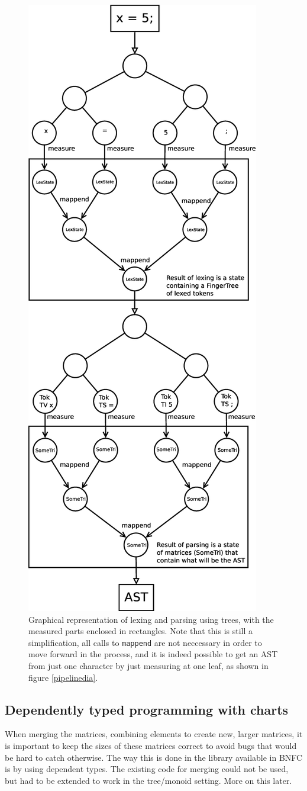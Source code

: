 \documentclass[a4paper,12pt,twosided]{report}
\begin{document}
\begin{figure}[H]
\centering
\includegraphics[width=.5\textwidth]{tree.eps}
\caption{\label{treemeasure}Graphical representation of lexing and parsing using
trees, with the measured parts enclosed in rectangles. Note that this is still a
simplification, all calls to \texttt{mappend} are not neccessary in order to
move forward in the process, and it is indeed possible to get an AST from just
one character by just measuring at one leaf, as shown in figure
\ref{pipelinedia}.}
\end{figure}

\subsection{Dependently typed programming with charts}
When merging the matrices, combining elements to create new, larger matrices, it
is important to keep the sizes of these matrices correct to avoid bugs that
would be hard to catch otherwise. The way this is done in the library available
in BNFC is by using dependent types. The existing code for merging could not be
used, but had to be extended to work in the tree/monoid setting. More on this
later.
\end{document}
